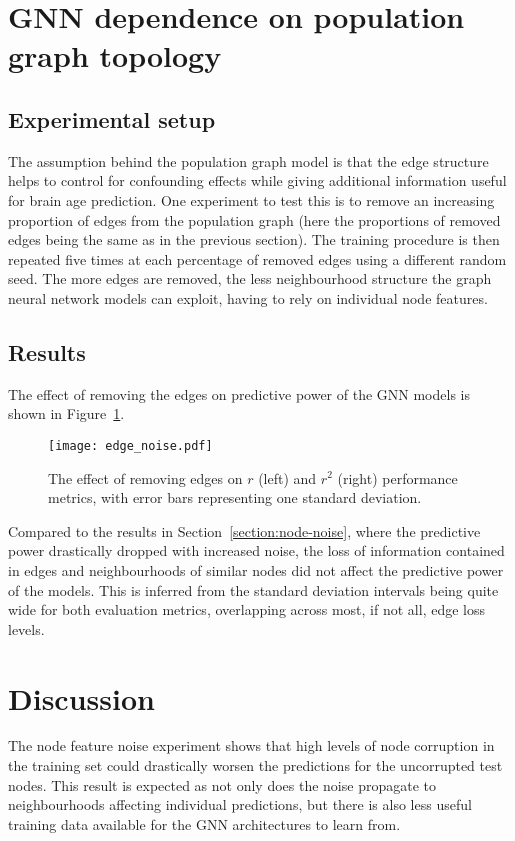 \section{GNN dependence on population graph topology}
\label{section:edge-noise}
\subsection{Experimental setup}
The assumption behind the population graph model is that the edge structure helps to control for confounding effects while giving additional information useful for brain age prediction. One experiment to test this is to remove an increasing proportion of edges from the population graph (here the proportions of removed edges being the same as in the previous section). The training procedure is then repeated five times at each percentage of removed edges using a different random seed. The more edges are removed, the less neighbourhood structure the graph neural network models can exploit, having to rely on individual node features. 

\subsection{Results}
The effect of removing the edges on predictive power of the GNN models is shown in Figure~\ref{figure:edge-noise}.

\begin{figure}[h]
    \centering
    \texttt{[image: edge\_noise.pdf]}
    \caption{The effect of removing edges on $r$ (left) and $r^2$ (right) performance metrics, with error bars representing one standard deviation.}\label{figure:edge-noise}
\end{figure}

Compared to the results in Section~\ref{section:node-noise}, where the predictive power drastically dropped with increased noise, the loss of information contained in edges and neighbourhoods of similar nodes did not affect the predictive power of the models. This is inferred from the standard deviation intervals being quite wide for both evaluation metrics, overlapping across most, if not all, edge loss levels.

\section{Discussion}
\label{section:discussion}
The node feature noise experiment shows that high levels of node corruption in the training set could drastically worsen the predictions for the uncorrupted test nodes. This result is expected as not only does the noise propagate to neighbourhoods affecting individual predictions, but there is also less useful training data available for the GNN architectures to learn from.
 
